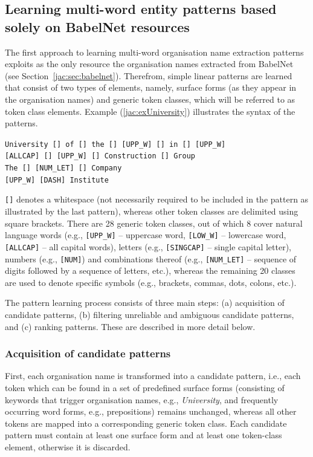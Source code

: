 \documentclass[output=paper]{langsci/langscibook}
\begin{document}
\subsection{Learning multi-word entity patterns based solely on BabelNet resources}
\label{jac:sec:babelnet-only-derived-patterns}

The first approach to learning multi-word organisation name extraction patterns exploits as the only resource the organisation names extracted from BabelNet (see Section~\ref{jac:sec:babelnet}). Therefrom, simple linear patterns are learned that consist of two types of elements, namely, surface forms (as they appear in the organisation names) and generic token classes, which will be referred to as token class elements. Example (\ref{jac:exUniversity}) illustrates the syntax of the patterns.

\ea\label{jac:exUniversity}
    \texttt{University [] of [] the [] [UPP\_W] [] in [] [UPP\_W]} \\
    \texttt{[ALLCAP] [] [UPP\_W] [] Construction [] Group} \\
    \texttt{The [] [NUM\_LET] [] Company} \\
    \texttt{[UPP\_W] [DASH] Institute}
\z

\noindent \verb+[]+ denotes a whitespace (not necessarily required to be included in the pattern as illustrated by the last pattern), whereas other token classes are delimited using square brackets. There are 28 generic token classes, out of which 8 cover natural language words (e.g., \verb+[UPP_W]+ -- uppercase word, \verb+[LOW_W]+ -- lowercase word, \verb+[ALLCAP]+ -- all capital words), letters (e.g., \verb+[SINGCAP]+ -- single capital letter), numbers (e.g., \verb+[NUM]+) and combinations thereof (e.g., \verb+[NUM_LET]+ -- sequence of digits followed by a sequence of letters, etc.), whereas the remaining 20 classes are used to denote specific symbols (e.g., brackets, commas, dots, colons, etc.). 

The pattern learning process consists of three main steps: (a) acquisition of candidate patterns, (b) filtering unreliable and ambiguous candidate patterns, and (c) ranking patterns. These are described in more detail below.

\subsubsection{Acquisition of candidate patterns} First, each organisation name is transformed into a candidate pattern, i.e., each token which can be found in a set of predefined surface forms (consisting of keywords that trigger organisation names, e.g.,  \textit{University}, and frequently occurring word forms, e.g., prepositions) remains unchanged, whereas all other tokens are mapped into a corresponding generic token class. Each candidate pattern must contain at least one surface form and at least one token-class element,
otherwise it is discarded.
\end{document}
